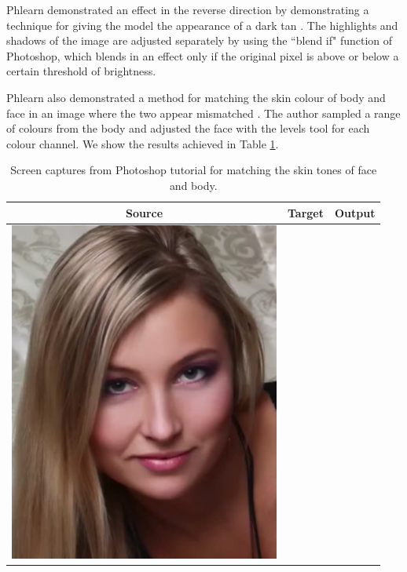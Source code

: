 Phlearn demonstrated an effect in the reverse direction by demonstrating a technique for giving the model the appearance of a dark tan \cite{photoshop:tan}. The highlights and shadows of the image are adjusted separately by using the ``blend if" function of Photoshop, which blends in an effect only if the original pixel is above or below a certain threshold of brightness.

Phlearn also demonstrated a method for matching the skin colour of body and face in an image where the two appear mismatched \cite{photoshop:match_body}. The author sampled a range of colours from the body and adjusted the face with the levels tool for each colour channel. We show the results achieved in Table \ref{tab:match_body_demo}.

\begin{table}[H]
    \centering
    \caption{Screen captures from Photoshop tutorial for matching the skin tones of face and body. \label{tab:match_body_demo}}
\begin{tabular}{|c|c|c|}
    \hline
    Source & Target & Output \\
    \hline
  \begin{minipage}{.29\textwidth}
    \includegraphics[width=\textwidth,height=\textheight,keepaspectratio]{images/match_body_orig}

\end{minipage}
\end{tabular}
\end{table}
